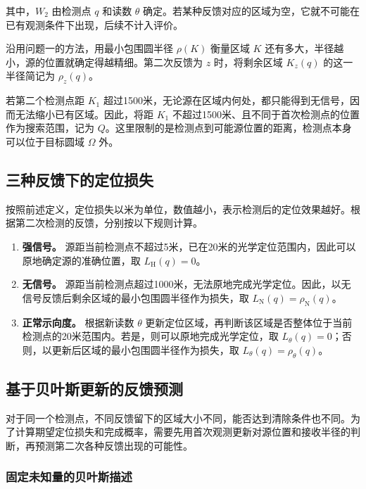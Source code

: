 其中，\(W_2\) 由检测点 \(q\) 和读数 \(\theta\) 确定。若某种反馈对应的区域为空，它就不可能在已有观测条件下出现，后续不计入评价。

沿用问题一的方法，用最小包围圆半径 \(\rho(K)\) 衡量区域 \(K\) 还有多大，半径越小，源的位置就确定得越精细。第二次反馈为 \(z\) 时，将剩余区域 \(K_z(q)\) 的这一半径简记为 \(\rho_z(q)\)。

若第二个检测点距 \(K_1\) 超过1500米，无论源在区域内何处，都只能得到无信号，因而无法缩小已有区域。因此，将距 \(K_1\) 不超过1500米、且不同于首次检测点的位置作为搜索范围，记为 \(Q\)。这里限制的是检测点到可能源位置的距离，检测点本身可以位于目标圆域 \(\Omega\) 外。

\subsection{三种反馈下的定位损失}

按照前述定义，定位损失以米为单位，数值越小，表示检测后的定位效果越好。根据第二次检测的反馈，分别按以下规则计算。

\begin{enumerate}[label=(\arabic*),leftmargin=2.2em]
  \item \textbf{强信号。} 源距当前检测点不超过5米，已在20米的光学定位范围内，因此可以原地确定源的准确位置，取 \(L_{\mathrm H}(q)=0\)。
  \item \textbf{无信号。} 源距当前检测点超过1000米，无法原地完成光学定位。因此，以无信号反馈后剩余区域的最小包围圆半径作为损失，取 \(L_{\mathrm N}(q)=\rho_{\mathrm N}(q)\)。
  \item \textbf{正常示向度。} 根据新读数 \(\theta\) 更新定位区域，再判断该区域是否整体位于当前检测点的20米范围内。若是，则可以原地完成光学定位，取 \(L_\theta(q)=0\)；否则，以更新后区域的最小包围圆半径作为损失，取 \(L_\theta(q)=\rho_\theta(q)\)。
\end{enumerate}

\subsection{基于贝叶斯更新的反馈预测}

对于同一个检测点，不同反馈留下的区域大小不同，能否达到清除条件也不同。为了计算期望定位损失和完成概率，需要先用首次观测更新对源位置和接收半径的判断，再预测第二次各种反馈出现的可能性。

\subsubsection{固定未知量的贝叶斯描述}


